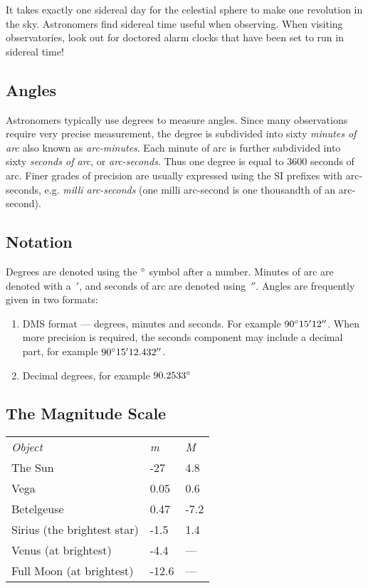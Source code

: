 It takes exactly one sidereal day for the celestial sphere to make one
revolution in the sky. Astronomers find sidereal time useful when
observing. When visiting observatories, look out for doctored alarm
clocks that have been set to run in sidereal time!

\subsection{Angles}\label{angles}

Astronomers typically use degrees to measure angles. Since many
observations require very precise measurement, the degree is subdivided
into sixty \emph{minutes of arc} also known as \emph{arc-minutes}. Each
minute of arc is further subdivided into sixty \emph{seconds of arc}, or
\emph{arc-seconds}. Thus one degree is equal to 3600 seconds of arc.
Finer grades of precision are usually expressed using the SI prefixes
with arc-seconds, e.g. \emph{milli arc-seconds} (one milli arc-second is
one thousandth of an arc-second).

\subsection{Notation}\label{notation}

Degrees are denoted using the $\degree$ symbol after a number. Minutes of arc are denoted with a~$'$, and seconds of arc are denoted using~$''$. Angles are frequently given in two formats:

\begin{enumerate}
\item
  DMS format --- degrees, minutes and seconds. For example $90\degree15'12''$.
  When more precision is required, the seconds component may include a
  decimal part, for example $90\degree15'12.432''$.
\item
  Decimal degrees, for example $90.2533\degree$
\end{enumerate}

\subsection{The Magnitude Scale}\label{the-magnitude-scale}

\begin{longtable}[c]{@{}lll@{}}
\toprule
\emph{Object} & \emph{m} & \emph{M}\tabularnewline
The Sun & -27 & 4.8\tabularnewline
Vega & 0.05 & 0.6\tabularnewline
Betelgeuse & 0.47 & -7.2\tabularnewline
Sirius (the brightest star) & -1.5 & 1.4\tabularnewline
Venus (at brightest) & -4.4 & ---\tabularnewline
Full Moon (at brightest) & -12.6 & ---\tabularnewline
\bottomrule
\end{longtable}


